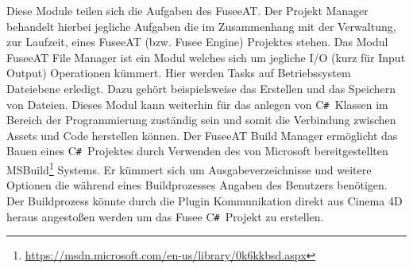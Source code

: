 \documentclass[pagesize, paper=a4, fontsize=12pt, titlepage=true, headings=small, headnosepline, abstractoff, liststotoc, nochapterprefix, plainheadsepline, twoside]{scrreprt}
\newcommand{\CSS}{C\texttt{\# }}
\begin{document}
Diese Module teilen sich die Aufgaben des FuseeAT. Der Projekt Manager behandelt hierbei jegliche Aufgaben die im Zusammenhang mit der Verwaltung, zur Laufzeit,  eines FuseeAT (bzw. Fusee Engine) Projektes stehen.
Das Modul FuseeAT File Manager ist ein Modul welches sich um jegliche I/O (kurz für Input Output) Operationen kümmert. Hier werden Tasks auf Betriebssystem Dateiebene erledigt. Dazu gehört beispielsweise das Erstellen und das Speichern von Dateien. Dieses Modul kann weiterhin für das anlegen von \CSS Klassen im Bereich der Programmierung zuständig sein und somit die Verbindung zwischen Assets und Code herstellen können.
Der FuseeAT Build Manager ermöglicht das Bauen eines \CSS Projektes durch Verwenden des von Microsoft bereitgestellten MSBuild\footnote{\url{https://msdn.microsoft.com/en-us/library/0k6kkbsd.aspx}} Systems. Er kümmert sich um Ausgabeverzeichnisse und weitere Optionen die während eines Buildprozesses Angaben des Benutzers benötigen. Der Buildprozess könnte durch die Plugin Kommunikation direkt aus Cinema 4D heraus angestoßen werden um das Fusee \CSS Projekt zu erstellen.
\end{document}
